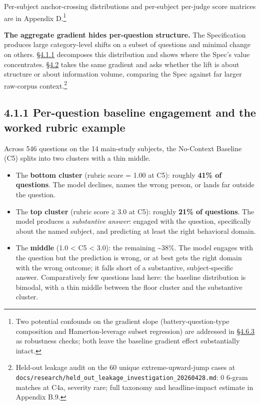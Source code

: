 Per-subject anchor-crossing distributions and per-subject per-judge
score matrices are in Appendix D.\footnote{Two potential confounds on
  the gradient slope (battery-question-type composition and
  Hamerton-leverage subset regression) are addressed in \hyperref[battery-composition-sensitivity]{§4.6.3} as
  robustness checks; both leave the baseline gradient effect
  substantially intact.}

\textbf{The aggregate gradient hides per-question structure.} The
Specification produces large category-level shifts on a subset of
questions and minimal change on others. \hyperref[per-question-baseline-engagement-and-the-worked-rubric-example]{§4.1.1} decomposes this
distribution and shows where the Spec's value concentrates. \hyperref[compression-structure-vs.-raw-text]{§4.2} takes
the same gradient and asks whether the lift is about structure or about
information volume, comparing the Spec against far larger raw-corpus
context.\footnote{Held-out leakage audit on the 60 unique
  extreme-upward-jump cases at
  \texttt{docs/research/held\_out\_leakage\_investigation\_20260428.md}:
  0 6-gram matches at C4a, severity rare; full taxonomy and
  headline-impact estimate in Appendix B.9.}

\hypertarget{per-question-baseline-engagement-and-the-worked-rubric-example}{%
\subsection{4.1.1 Per-question baseline engagement and the worked rubric
example}\label{per-question-baseline-engagement-and-the-worked-rubric-example}}

Across 546 questions on the 14 main-study subjects, the No-Context
Baseline (C5) splits into two clusters with a thin middle.

\begin{itemize}
\tightlist
\item
  The \textbf{bottom cluster} (rubric score = 1.00 at C5): roughly
  \textbf{41\% of questions}. The model declines, names the wrong
  person, or lands far outside the question.
\item
  The \textbf{top cluster} (rubric score ≥ 3.0 at C5): roughly
  \textbf{21\% of questions}. The model produces a \emph{substantive
  answer}: engaged with the question, specifically about the named
  subject, and predicting at least the right behavioral domain.
\item
  The \textbf{middle} (1.0 \textless{} C5 \textless{} 3.0): the
  remaining \textasciitilde38\%. The model engages with the question but
  the prediction is wrong, or at best gets the right domain with the
  wrong outcome; it falls short of a substantive, subject-specific
  answer. Comparatively few questions land here: the baseline
  distribution is bimodal, with a thin middle between the floor cluster
  and the substantive cluster.
\end{itemize}

